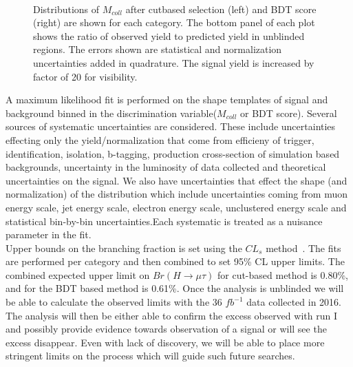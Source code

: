 \documentclass[a4paper,11pt]{article}
\begin{document}
\begin{figure}[htpb]
\begin{center}
\hspace{1cm}
\\
\end{center}
\caption{Distributions of $M_{coll}$ after cutbased selection (left) and BDT score (right) are shown for each category. The bottom panel of each plot shows the ratio of observed yield to predicted yield in unblinded regions. The errors shown are statistical and normalization uncertainties added in quadrature. The signal yield is increased by factor of 20 for visibility.}
\label{fig:plots}
\end{figure}

A maximum likelihood fit is performed on the shape templates of signal and background binned in the discrimination variable($M_{coll}$ or BDT score). Several sources of systematic uncertainties are considered. These include uncertainties effecting only the yield/normalization that come from efficieny of trigger, identification, isolation, b-tagging, production cross-section  of simulation based backgrounds, uncertainty in the luminosity of data collected and theoretical uncertainties on the signal. We also have uncertainties that effect the shape (and normalization) of the distribution which include uncertainties coming from muon energy scale, jet energy scale, electron energy scale, unclustered energy scale and statistical bin-by-bin uncertainties.Each systematic is treated as a nuisance parameter in the fit.\\
Upper bounds on the branching fraction is set using the $CL_{s}$ method~\cite{k}. The fits are performed per category and then combined to set 95\% CL upper limits. The combined expected upper limit on $Br(H\rightarrow\mu\tau)$ for cut-based method is 0.80\%, and for the BDT based method is 0.61\%. Once the analysis is unblinded we will be able to calculate the observed limits with the 36 $fb^{-1}$ data collected in 2016. The analysis will then be either able to confirm the excess observed with run I and possibly provide evidence towards observation of a signal or will see the excess disappear. Even with lack of discovery, we will be able to place more stringent limits on the process which will guide such future searches.         
\end{document}
